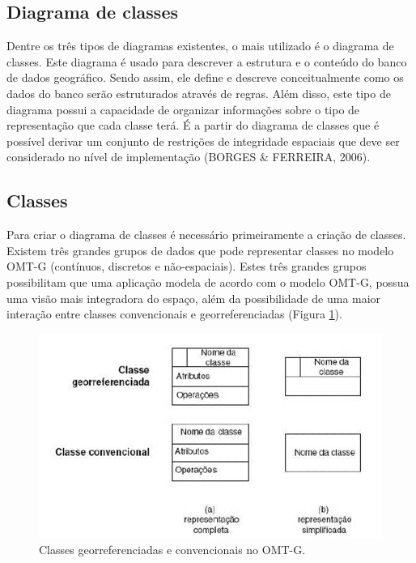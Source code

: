 	   \subsection{Diagrama de classes}
	   
		Dentre os três tipos de diagramas existentes, o mais utilizado é o diagrama de classes. Este diagrama é usado para descrever a estrutura e o conteúdo do banco de dados geográfico. Sendo assim, ele define e descreve conceitualmente como os dados do banco serão estruturados através de regras. Além disso, este tipo de diagrama possui a capacidade de organizar informações sobre o tipo de representação que cada classe terá. É a partir do diagrama de classes que é possível derivar um conjunto de restrições de integridade espaciais que deve ser considerado no nível de implementação (BORGES \& FERREIRA, 2006).
	
		\subsection{Classes}
		
		Para criar o diagrama de classes é necessário primeiramente a criação de classes. Existem três grandes grupos de dados que pode representar classes no modelo OMT-G (contínuos, discretos e não-espaciais). Estes três grandes grupos possibilitam que uma aplicação modela de acordo com o modelo OMT-G, possua uma visão mais integradora do espaço, além da possibilidade de uma maior interação entre classes convencionais e georreferenciadas (Figura \ref{fig:omtgclasses}).
		
		\begin{figure} [h]
			\centering
			\includegraphics[width=1\linewidth]{data/omtg_classes}
			\caption{Classes georreferenciadas e convencionais no OMT-G.\cite{BORGES_etal05}}
			\label{fig:omtgclasses}
		\end{figure}
	
